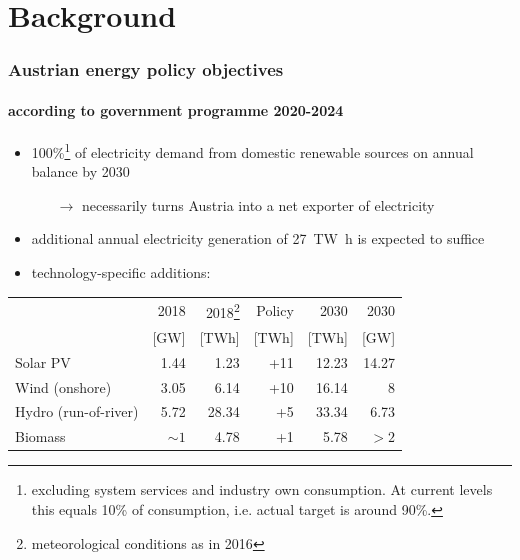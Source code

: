\documentclass[aspectratio=1610, xcolor=dvipsnames,handout]{beamer} %
\begin{document}
\section{Background}
\begin{frame}
\frametitle{Austrian energy policy objectives}
\framesubtitle{according to government programme 2020-2024}
\begin{itemize}
\item 100\%\footnote[frame]{excluding system services and industry own consumption. At current levels this equals 10\% of consumption, i.e. actual target is around 90\%.} of electricity demand from domestic renewable sources on annual balance by 2030 \pause
\begin{itemize}
\item[$\rightarrow$] necessarily turns Austria into a net exporter of electricity \pause
\end{itemize}
\item additional annual electricity generation of \SI{27}{\tera\watt\hour} is expected to suffice \pause
\item technology-specific additions:
\end{itemize}

\begin{table}
\centering
\begin{tabular}{| l | r | r | r | r | r |}
\hline
 & 2018 & 2018\footnote[frame]{meteorological conditions as in 2016} & Policy & 2030 & 2030 \\ 
 & [GW] & [TWh] & [TWh] & [TWh] & [GW] \\ \hline \hline
Solar PV & 1.44 & 1.23 & +11 & 12.23 &  14.27 \\ \hline
Wind (onshore) & 3.05 & 6.14 & +10 & 16.14 & 8 \\ \hline
Hydro (run-of-river) & 5.72 & 28.34 & +5 & 33.34 & 6.73 \\ \hline
Biomass & $\sim 1$ & 4.78 & +1 & 5.78 & $>2$ \\ \hline
\end{tabular}
\end{table}
\end{frame}
\end{document}
